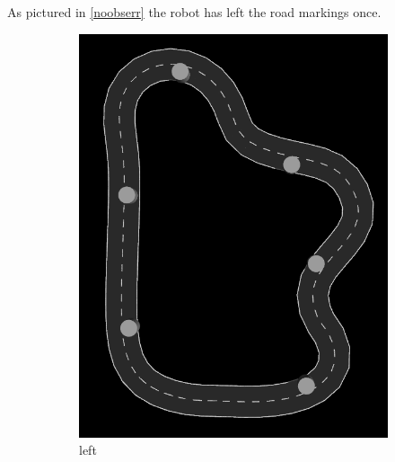 As pictured in \ref{noobserr} the robot has left the road markings once.\\

\begin{figure}[H]
	\begin{subfigure}{.5\linewidth}
		\includegraphics[width=\textwidth]{Pictures/obstacle left final 2}
		\caption{left}
	\end{subfigure}	
	\begin{subfigure}{.5\linewidth}

\end{subfigure}
\end{figure}
